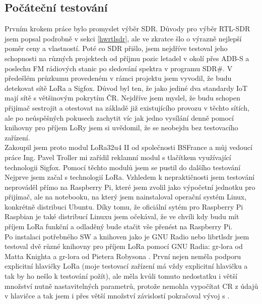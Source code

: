 \documentclass{ctuthesis}
\begin{document}
\subsection{Počáteční testování}
Prvním krokem práce bylo promyslet výběr SDR. Důvody pro výběr RTL-SDR jsem popsal podrobně v sekci \ref{hwrtlsdr}, ale ve zkratce šlo o výrazně nejlepší poměr ceny a vlastností. Poté co SDR přišlo, jsem nejdříve testoval jeho schopnosti na různých projektech od příjmu pozic letadel v okolí přes ADB-S a poslechu FM rádiových stanic po sledování spektra v programu SDR\#.
V předešlém průzkumu provedeném v rámci projektu jsem vyvodil, že budu detekovat sítě LoRa a Sigfox. Důvod byl ten, že jako jediné dva standardy IoT mají sítě s většinovým pokrytím ČR. Nejdříve jsem myslel, že budu schopen přijímač sestrojit a otestovat na základě již existujícího provozu v těchto sítích, ale po neúspěšných pokusech zachytit víc jak jedno vysílání denně pomocí knihovny pro příjem LoRy jsem si uvědomil, že se neobejdu bez testovacího zařízení.\\
Zakoupil jsem proto modul LoRa32u4 II od společnosti BSFrance a můj vedoucí práce Ing. Pavel Troller mi zařídil reklamní modul s tlačítkem využívající technologii Sigfox. Pomocí těchto modulů jsem se pustil do dalšího testování\\
Nejprve jsem začal s technologií LoRa. Vzhledem k nepraktičnosti jsem testování neprováděl přímo na Raspberry Pi, které jsem zvolil jako výpočetní jednotku pro přijímač, ale na notebooku, na který jsem nainstaloval operační systém Linux, konkrétně distribuci Ubuntu. Díky tomu, že oficiální sytém pro Raspberry Pi Raspbian je také distribucí Linuxu jsem očekával, že ve chvíli kdy budu mít příjem LoRa funkční a odladěný bude stačit vše přenést na Raspberry Pi.\\
Po instalaci potřebného SW a knihoven jako je GNU Radio nebo librtlsdr jsem testoval dvě různé knihovny pro příjem LoRa pomocí GNU Radia: gr-lora od Matta Knighta\cite{mattknight} a gr-lora od Pietera Robysona \cite{pieterrobynson}. První nejen neměla podporu explicitní hlavičky LoRa (moje testovací zařízení má vždy explicitní hlavičku a tak by ho nešlo k testování požít), ale měla kvůli tomuto nedostatku i větší množství nutně nastavitelných parametrů, protože nemohla vypočítat CR z údajů v hlavičce a tak jsem i přes větší množství závislostí pokračoval vývoj s \cite{pieterrobynson}. \\
\end{document}
